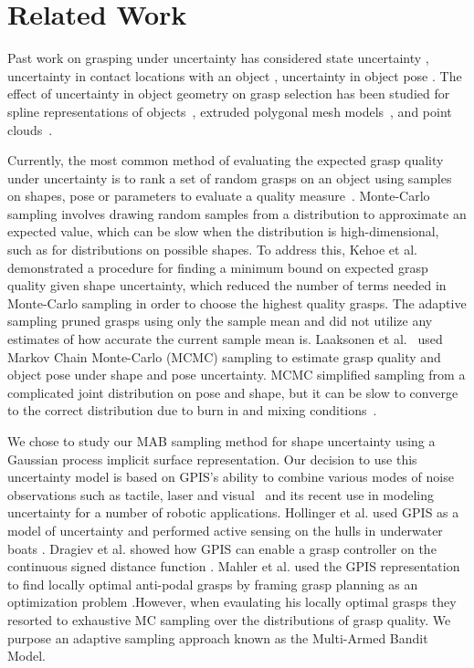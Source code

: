 \documentclass[letterpaper, 10 pt, conference]{ieeeconf}  %
\begin{document}
\section{Related Work}

Past work on grasping under uncertainty has considered state uncertainty \cite{goldberg1990bayesian, stulp2011learning}, uncertainty in contact locations with an object \cite{zheng2005}, uncertainty in object pose \cite{christopoulos2007handling, weisz2012pose, kim2012physically}.
The effect of uncertainty in object geometry on grasp selection has been studied for spline representations of objects~\cite{christopoulos2007handling}, extruded polygonal mesh models~\cite{kehoe2012estimating, kehoe2012toward}, and point clouds~\cite{hsiao2011bayesian}.

Currently, the most common method of evaluating the expected grasp quality under uncertainty is to rank a set of random grasps on an object using  samples on shapes, pose or parameters to evaluate a quality measure~\cite{christopoulos2007handling, kehoe2012estimating, kehoe2012toward}.
Monte-Carlo sampling involves drawing random samples from a distribution to approximate an expected value\cite{caflisch1998monte}, which can be slow when the distribution is high-dimensional, such as for distributions on possible shapes.
To address this, Kehoe et al.~\cite{kehoe2012estimating} demonstrated a procedure for finding a minimum bound on expected grasp quality given shape uncertainty, which reduced the number of terms needed in Monte-Carlo sampling in order to choose the highest quality grasps. The adaptive sampling pruned grasps using only the sample mean and did not utilize any estimates of how accurate the current sample mean is. 
Laaksonen et al.~\cite{laaksonen2012probabilistic} used Markov Chain Monte-Carlo (MCMC) sampling to estimate grasp quality and object pose  under shape and pose uncertainty.
MCMC simplified sampling from a complicated joint distribution on pose and shape, but it can be slow to converge to the correct distribution due to burn in and mixing conditions~\cite{andrieu2003introduction}.

We chose to study our MAB sampling method for shape uncertainty using a Gaussian process implicit surface representation. Our decision to use this uncertainty model is based on GPIS's ability to combine various modes of noise observations such as tactile, laser and visual~\cite{rasmussen2006, williams2007, dragiev2011} and its recent use in modeling uncertainty for a number of robotic applications.
Hollinger et al. used GPIS as a model of uncertainty and performed active sensing on the hulls in underwater boats \cite{hollinger2013}.
Dragiev et al. showed how GPIS can enable a grasp controller on the continuous signed distance function \cite{dragiev2011}.
Mahler et al. used the GPIS representation to find locally optimal anti-podal grasps by framing grasp planning as an optimization problem \cite{mahler2015opt}.However, when evaulating his locally optimal grasps they resorted to exhaustive MC sampling over the distributions of grasp quality. We purpose an adaptive sampling approach known as the Multi-Armed Bandit Model. 
\end{document}
